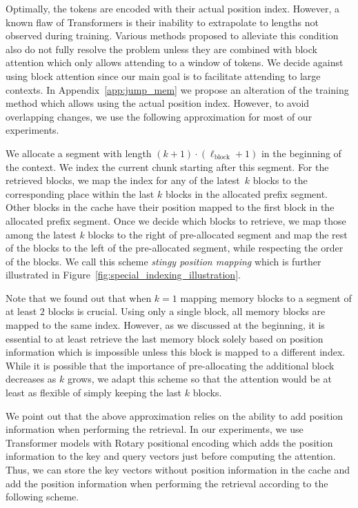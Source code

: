 Optimally, the tokens are encoded with their actual position index. However, a known flaw of Transformers is their inability to extrapolate to lengths not observed during training. Various methods proposed to alleviate this condition also do not fully resolve the problem unless they are combined with block attention which only allows attending to a window of tokens. We decide against using block attention since our main goal is to facilitate attending to large contexts. In Appendix~\ref{app:jump_mem} we propose an alteration of the training method which allows using the actual position index. However, to avoid overlapping changes, we use the following approximation for most of our experiments.

We allocate a segment with length $(k\!+\!1) \cdot (\ell_{\text{block}}\!+\!1)$ in the beginning of the context. We index the current chunk starting after this segment. For the retrieved blocks, we map the index for any of the latest~$k$ blocks to the corresponding place within the last $k$ blocks in the allocated prefix segment. Other blocks in the cache have their position mapped to the first block in the allocated prefix segment. Once we decide which blocks to retrieve, we map those among the latest $k$ blocks to the right of pre-allocated segment and map the rest of the blocks to the left of the pre-allocated segment, while respecting the order of the blocks. We call this scheme \emph{stingy position mapping} which is further illustrated in Figure~\ref{fig:special_indexing_illustration}. 

Note that we found out that when $k\!=\!1$ mapping memory blocks to a segment of at least $2$ blocks is crucial. Using only a single block, all memory blocks are mapped to the same index. However, as we discussed at the beginning, it is essential to at least retrieve the last memory block solely based on position information which is impossible unless this block is mapped to a different index. While it is possible that the importance of pre-allocating the additional block decreases as $k$ grows, we adapt this scheme so that the attention would be at least as flexible of simply keeping the last $k$ blocks.

We point out that the above approximation relies on the ability to add position information when performing the retrieval. In our experiments, we use Transformer models with Rotary positional encoding \cite{su_roformer_2022} which adds the position information to the key and query vectors just before computing the attention. Thus, we can store the key vectors without position information in the cache and add the position information when performing the retrieval according to the following scheme.

